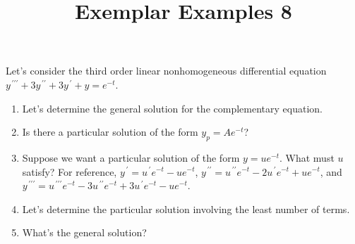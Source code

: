 \documentclass{ximera}
\begin{document}
\begin{abstract}
 \end{abstract}

    \title{Exemplar Examples 8}
    
    \maketitle



Let's consider the third order linear nonhomogeneous differential equation \\$y^{\,\prime\prime\prime}+3y^{\,\prime\prime}+3y^{\,\prime}+y=e^{-t}$.

\begin{enumerate}
    \item Let's determine the general solution for the complementary equation.

    \vfill

    \item Is there a particular solution of the form $y_p=Ae^{-t}$?

    \vspace{5cm}

    \newpage
    

    \item Suppose we want a particular solution of the form $y=ue^{-t}$.  What must $u$ satisfy?  For reference, $y^{\,\prime}=u^{\,\prime}e^{-t}-ue^{-t}$, $y^{\,\prime\prime}=u^{\,\prime\prime}e^{-t}-2u^{\,\prime}e^{-t}+ue^{-t}$, and $y^{\,\prime\prime\prime}=u^{\,\prime\prime\prime}e^{-t}-3u^{\,\prime\prime}e^{-t}+3u^{\,\prime}e^{-t}-ue^{-t}$.

    \vfill

    \item Let's determine the particular solution involving the least number of terms.

    \vspace{1cm}

    \item What's the general solution?

\vspace{2cm}    

    
\end{enumerate}
\end{document}
